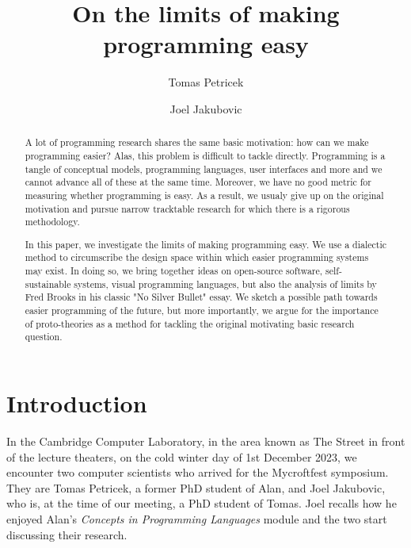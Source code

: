 \documentclass[runningheads]{llncs}
\begin{document}
\title{On the limits of making programming easy}

\author{Tomas Petricek \and
Joel Jakubovic}


\maketitle

\begin{abstract}
A lot of programming research shares the same basic motivation: how can we make programming easier? Alas, this problem is difficult to tackle directly. Programming is a tangle of conceptual models, programming languages, user interfaces and more and we cannot advance all of these at the same time. Moreover, we have no good metric for measuring whether programming is easy. As a result, we usualy give up on the original motivation and pursue narrow tracktable research for which there is a rigorous methodology.

\qquad In this paper, we investigate the limits of making programming easy. We use a dialectic method to circumscribe the design space within which easier programming systems may exist. In doing so, we bring together ideas on open-source software, self-sustainable systems, visual programming languages, but also the analysis of limits by Fred Brooks in his classic "No Silver Bullet" essay. We sketch a possible path towards easier programming of the future, but more importantly, we argue for the importance of proto-theories as a method for tackling the original motivating basic research question.

\end{abstract}

\section{Introduction}
In the Cambridge Computer Laboratory, in the area known as The Street in front of the lecture theaters, on the cold winter day of 1st December 2023, we encounter two computer scientists who arrived for the Mycroftfest symposium. They are Tomas Petricek, a former PhD student of Alan, and Joel Jakubovic, who is, at the time of our meeting, a PhD student of Tomas. Joel recalls how he enjoyed Alan's \emph{Concepts in Programming Languages} module and the two start discussing their research.
\end{document}
